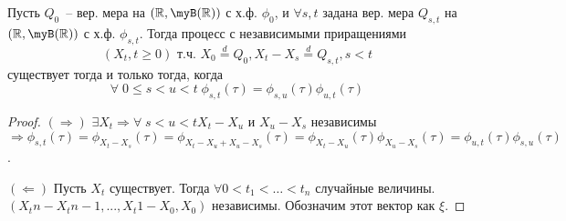 \begin{theorem}
Пусть $Q_0$~-- вер. мера на $(\myR, \myB(\myR))$ с х.ф. $\phi_0$,
и $\forall s,t$ задана вер. мера $Q_{s,t}$ на $(\myR, \myB(\myR))$ с х.ф. $\phi_{s,t}$.
Тогда процесс с независимыми приращениями
$$(X_t, t \geq 0) \text{ т.ч. } X_0 \overset{d}{=} Q_0, X_t - X_s \overset{d}{=} Q_{s,t}, s < t$$
существует тогда и только тогда, когда
$$\forall \; 0 \leq s < u < t \; \phi_{s,t}(\tau) = \phi_{s,u}(\tau) \phi_{u,t}(\tau)$$
\end{theorem}
\begin{proof} \forcenewline
$(\Rightarrow)$ $\exists X_t \Rightarrow \forall \; s < u < t X_t-X_u$ и 
$X_u-X_s$ независимы $\Rightarrow \phi_{s,t}(\tau) = \phi_{X_t-X_s}(\tau)=
\phi_{X_t-X_u+X_u-X_s}(\tau) =
\phi_{X_t-X_u}(\tau) \phi_{X_u-X_s}(\tau) =
\phi_{u,t}(\tau) \phi_{s,u}(\tau)$.

$(\Leftarrow)$ Пусть $X_t$ существует. Тогда $\forall 0 < t_1 < \dots < t_n$
случайные величины. $(X_tn-X_tn-1, ..., X_t1-X_0, X_0)$ независимы. Обозначим этот вектор как $\xi$.
% 
% 
% 
% 
% 
% 
% 
% 
% 
% 
% 
\end{proof}

